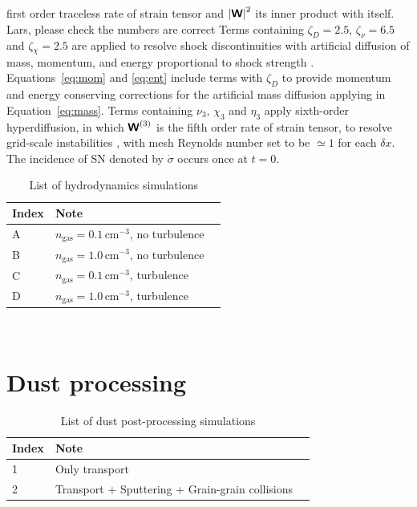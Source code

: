 \documentclass[fleqn,usenatbib]{mnras}
\newcommand{\fg}[1]{\textcolor{mypurple}{#1}}
\newcommand\dx{ {\delta x}}
\begin{document}
 first order traceless rate of strain tensor and $\left|{\textbf{\textsf{W}}}\right|^{2}$ its
 inner product with itself.
 \fg{Lars, please check the numbers are correct}
 Terms containing $\zeta_D{=2.5},\,\zeta_\nu{=6.5}$ and $\zeta{_\chi=2.5}$
 are applied to resolve shock discontinuities with artificial diffusion of
 mass, momentum, and energy proportional to shock strength
 \citep[see][for details]{GMKSH20}.
 Equations~\eqref{eq:mom} and \eqref{eq:ent} include terms with $\zeta_D$
 to provide momentum and energy conserving corrections for the
 artificial mass diffusion applying in Equation~\eqref{eq:mass}.
 Terms containing $\nu_3,\,\chi_3$ and $\eta_3$ apply sixth-order hyperdiffusion,
 in which ${\textbf{\textsf{W}}}^{(3)}$ is the fifth order rate of strain tensor, 
 to resolve grid-scale instabilities \citep[see, e.g.,][]{ABGS02,HB04,GMKS21},
 with mesh Reynolds number set to be $\simeq1$ for each $\dx$.
 The incidence of SN denoted by $\dot\sigma$ occurs once at $t=0$.


 \begin{table}
 \centering
 \caption{List of hydrodynamics simulations}
 \begin{tabular}{ l l l}
 \hline\hline
 Index&Note&\\\hline 
 A&$n_\text{gas}=0.1\,\text{cm}^{-3}$, no turbulence&\\\hline  
 B&$n_\text{gas}=1.0\,\text{cm}^{-3}$, no turbulence&\\\hline   
 C&$n_\text{gas}=0.1\,\text{cm}^{-3}$, turbulence&\\\hline  
 D&$n_\text{gas}=1.0\,\text{cm}^{-3}$, turbulence&\\\hline   
 \end{tabular}
 \label{List_hydrosimulations}
 \end{table}

\newpage~
\newpage
\section{Dust processing}
 \begin{table}
 \centering
 \caption{List of dust post-processing simulations}
 \begin{tabular}{ l l l}
 \hline\hline
 Index&Note&\\\hline 
 1&Only transport&\\\hline  
 2&Transport + Sputtering + Grain-grain collisions&\\\hline 
 \end{tabular}
 \label{List_Dustsimulations}
 \end{table}
 
\end{document}
